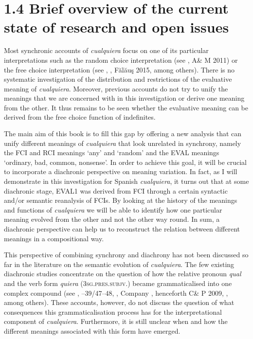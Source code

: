 \section{1.4 Brief overview of the current state of research and open issues}

Most synchronic accounts of \textit{cualquiera} focus on one of its particular interpretations such as the random choice interpretation (see \citealt{ChoiRomero2008}, A\& M 2011) or the free choice interpretation (see \citealt{Menéndez-Benito2010}, \citealt{AloniPort2013}, Fălăuş 2015, among others). There is no systematic investigation of the distribution and restrictions of the evaluative meaning of \textit{cualquiera}. Moreover, previous accounts do not try to unify the meanings that we are concerned with in this investigation or derive one meaning from the other. It thus remains to be seen whether the evaluative meaning can be derived from the free choice function of indefinites.

  The main aim of this book is to fill this gap by offering a new analysis that can unify different meanings of \textit{cualquiera} that look unrelated in synchrony, namely the FCI and RCI meanings ‘any’ and ‘random’ and the EVAL meanings ‘ordinary, bad, common, nonsense’. In order to achieve this goal, it will be crucial to incorporate a diachronic perspective on meaning variation. In fact, as I will demonstrate in this investigation for Spanish \textit{cualquiera}, it turns out that at some diachronic stage, EVAL1 was derived from FCI through a certain syntactic and/or semantic reanalysis of FCIs. By looking at the history of the meanings and functions of \textit{cualquiera} we will be able to identify how one particular meaning evolved from the other and not the other way round. In sum, a diachronic perspective can help us to reconstruct the relation between different meanings in a compositional way.

  This perspective of combining synchrony and diachrony has not been discussed so far in the literature on the semantic evolution of \textit{cualquiera}. The few existing diachronic studies concentrate on the question of how the relative pronoun \textit{qual} and the verb form \textit{quiera} (3\textsc{sg.pres.subjv.}) became grammaticalised into one complex compound (see \citealt{Palomo1934}, \citealt{Lombard1938}–39/47–48, \citealt{Rivero1988}, Company \citealt{CompanyPozas-Loyo2009}, henceforth C\& P 2009, \citealt{Mackenzie2019}, among others). These accounts, however, do not discuss the question of what consequences this grammaticalisation process has for the interpretational component of \textit{cualquiera}. Furthermore, it is still unclear when and how the different meanings associated with this form have emerged.

